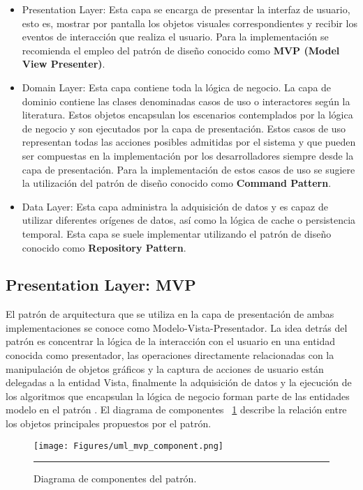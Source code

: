 \begin{itemize}
	\item Presentation Layer: Esta capa se encarga de presentar la interfaz de usuario, esto es, mostrar por pantalla los objetos visuales correspondientes y recibir los eventos de interacción que realiza el usuario. Para la implementación se recomienda el empleo del patrón de diseño conocido como \textbf{MVP (Model View Presenter)}. 
	\item Domain Layer: Esta capa contiene toda la lógica de negocio. La capa de dominio contiene las clases denominadas casos de uso o interactores según la literatura. Estos objetos encapsulan los escenarios contemplados por la lógica de negocio y son ejecutados por la capa de presentación. Estos casos de uso representan todas las acciones posibles admitidas por el sistema y que pueden ser compuestas en la implementación por los desarrolladores siempre desde la capa de presentación. Para la implementación de estos casos de uso se sugiere la utilización del patrón de diseño conocido como \textbf{Command Pattern}.
	\item Data Layer: Esta capa administra la adquisición de datos y es capaz de utilizar diferentes orígenes de datos, así como la lógica de cache o persistencia temporal. Esta capa se suele implementar utilizando el patrón de diseño conocido como \textbf{Repository Pattern}.  
\end{itemize}

\subsection{Presentation Layer: MVP}
El patrón de arquitectura que se utiliza en la capa de presentación de ambas implementaciones se conoce como Modelo-Vista-Presentador.
La idea detrás del patrón es concentrar la lógica de la interacción con el usuario en una entidad conocida como presentador, las operaciones directamente relacionadas con la manipulación de objetos gráficos y la captura de acciones de usuario están delegadas a la entidad Vista, finalmente la adquisición de datos y la ejecución de los algoritmos que encapsulan la lógica de negocio forman parte de las entidades modelo en el patrón \cite{mvp_leiva}.
El diagrama de componentes ~\ref{fig:uml_mvp_component} describe la relación entre los objetos principales propuestos por el patrón.

\begin{figure}[htbp]
	\centering
	\texttt{[image: Figures/uml\_mvp\_component.png]}
	\rule{35em}{1pt}
	\caption[MVP Components]{Diagrama de componentes del patrón.}
	\label{fig:uml_mvp_component}
\end{figure}

